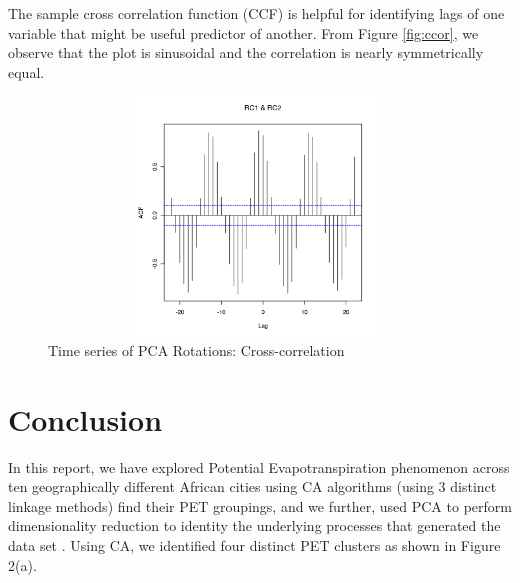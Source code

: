 \documentclass[12pt,a4paper]{article}
\begin{document}
The sample cross correlation function (CCF) is helpful for identifying lags of one variable that might be useful predictor of another. From Figure \ref{fig:ccor},  we observe that the plot is sinusoidal and the correlation is nearly symmetrically equal.
\begin{figure}[!h]
                 \centering
                 \includegraphics[width=0.98\textwidth,height=180pt]{./gaphics/q003_c.png}
\caption{Time series of PCA Rotations: Cross-correlation} 
\label{fig:ccor}
\label{fig2}
\end{figure}


\pagebreak
\section{Conclusion}
In this report,  we have explored Potential Evapotranspiration phenomenon across ten geographically different African cities using CA algorithms (using 3 distinct linkage methods) find their PET groupings, and we further,  used PCA to perform dimensionality reduction to identity the underlying processes that generated the data set \cite{wold1987principal}.    
Using CA,  we identified four distinct PET clusters as shown in  Figure 2(a).

\pagebreak
{}


\end{document}
